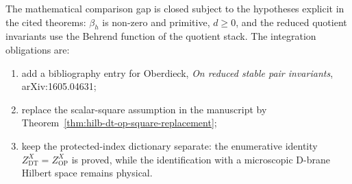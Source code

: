 The mathematical comparison gap is closed subject to the hypotheses
explicit in the cited theorems: \(\beta_h\) is non-zero and primitive,
\(d\geq0\), and the reduced quotient invariants use the Behrend
function of the quotient stack.  The integration obligations are:
\begin{enumerate}
\item add a bibliography entry for Oberdieck, \emph{On reduced stable
pair invariants}, arXiv:1605.04631;
\item replace the scalar-square assumption in the manuscript by
Theorem~\ref{thm:hilb-dt-op-square-replacement};
\item keep the protected-index dictionary separate: the enumerative
identity \(Z^X_{\mathrm{DT}}=Z^X_{\mathrm{OP}}\) is proved, while the
identification with a microscopic D-brane Hilbert space remains
physical.
\end{enumerate}
